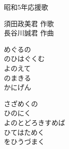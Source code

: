 \documentclass[10pt,b5j]{tarticle} %
\begin{document}
\begin{minipage}[c]{0.7\hsize} %
    \begin{center}
        {\LARGE
            昭和5年応援歌 %
        }
        {\small 
        }
    \end{center}
\end{minipage}
\begin{minipage}[c]{0.3\hsize} %
    \begin{flushright} %
        須田政美君 作歌\\長谷川誠君 作曲 %
    \end{flushright}
\end{minipage}

\vspace{1.5em} %
\newcommand{\linespace}{0.5em} %
\newcommand{\blocksize}{0.5\hsize} %
\begin{enumerate} %
    \begin{minipage}[c]{\blocksize}
    
        \vspace{\linespace}
        \item
        めぐるの\\
        のひはぐくむ\\
        よのえて\\
        のまきる\\
        かにげん
        
        \vspace{\linespace}
        \item
        さざめくの\\
        ひのにく\\
        よのとどろきすめば\\
        ひてはためく\\
        をひうづまく
    
    \end{minipage}
\end{enumerate} %
\end{document}
